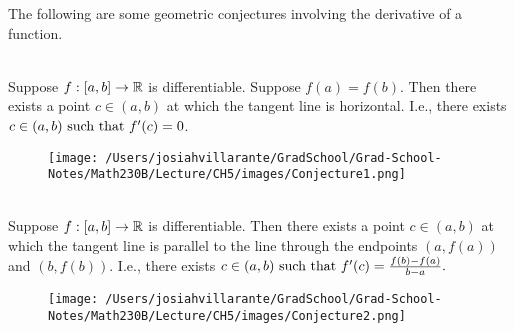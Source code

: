 
The following are some geometric conjectures involving the derivative of a function.

\begin{conjecture}\leavevmode\\
\label{Conj1}
Suppose $f:[a,b] \to \mathbb{R}$ is differentiable. Suppose $f(a) = f(b)$. Then there exists a point $c\in (a,b)$ at which the tangent line is horizontal. I.e., there exists $c\in(a,b) \text{ such that } f'(c) = 0$.
\end{conjecture}

\begin{figure}[h]
    \texttt{[image: /Users/josiahvillarante/GradSchool/Grad-School-Notes/Math230B/Lecture/CH5/images/Conjecture1.png]}
\end{figure}

\begin{conjecture}\leavevmode\\
\label{Conj2}
Suppose $f:[a,b] \to \mathbb{R}$ is differentiable. Then there exists a point $c \in (a,b)$ at which the tangent line is parallel to the line through the endpoints $(a, f(a))$ and $(b, f(b))$. I.e., there exists $c \in (a,b) \text{ such that } f'(c) = \frac{f(b) - f(a)}{b - a}.$
\end{conjecture}

\begin{figure}[h!]
    \texttt{[image: /Users/josiahvillarante/GradSchool/Grad-School-Notes/Math230B/Lecture/CH5/images/Conjecture2.png]}
\end{figure}

